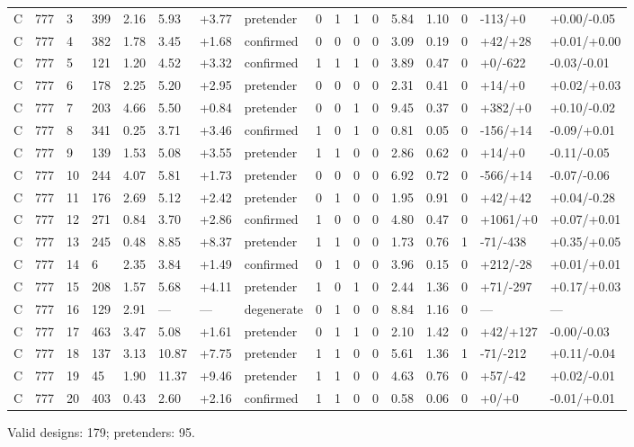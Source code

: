 \documentclass[11pt,a4paper]{article}
\begin{document}
{\begin{longtable}[]{@{}lllllllllllllllll@{}}
C & 777 & 3 & 399 & 2.16 & 5.93 & +3.77 & pretender & 0 & 1 & 1 & 0 & 5.84 & 1.10 & 0 & -113/+0 & +0.00/-0.05 \\
C & 777 & 4 & 382 & 1.78 & 3.45 & +1.68 & confirmed & 0 & 0 & 0 & 0 & 3.09 & 0.19 & 0 & +42/+28 & +0.01/+0.00 \\
C & 777 & 5 & 121 & 1.20 & 4.52 & +3.32 & confirmed & 1 & 1 & 1 & 0 & 3.89 & 0.47 & 0 & +0/-622 & -0.03/-0.01 \\
C & 777 & 6 & 178 & 2.25 & 5.20 & +2.95 & pretender & 0 & 0 & 0 & 0 & 2.31 & 0.41 & 0 & +14/+0 & +0.02/+0.03 \\
C & 777 & 7 & 203 & 4.66 & 5.50 & +0.84 & pretender & 0 & 0 & 1 & 0 & 9.45 & 0.37 & 0 & +382/+0 & +0.10/-0.02 \\
C & 777 & 8 & 341 & 0.25 & 3.71 & +3.46 & confirmed & 1 & 0 & 1 & 0 & 0.81 & 0.05 & 0 & -156/+14 & -0.09/+0.01 \\
C & 777 & 9 & 139 & 1.53 & 5.08 & +3.55 & pretender & 1 & 1 & 0 & 0 & 2.86 & 0.62 & 0 & +14/+0 & -0.11/-0.05 \\
C & 777 & 10 & 244 & 4.07 & 5.81 & +1.73 & pretender & 0 & 0 & 0 & 0 & 6.92 & 0.72 & 0 & -566/+14 & -0.07/-0.06 \\
C & 777 & 11 & 176 & 2.69 & 5.12 & +2.42 & pretender & 0 & 1 & 0 & 0 & 1.95 & 0.91 & 0 & +42/+42 & +0.04/-0.28 \\
C & 777 & 12 & 271 & 0.84 & 3.70 & +2.86 & confirmed & 1 & 0 & 0 & 0 & 4.80 & 0.47 & 0 & +1061/+0 & +0.07/+0.01 \\
C & 777 & 13 & 245 & 0.48 & 8.85 & +8.37 & pretender & 1 & 1 & 0 & 0 & 1.73 & 0.76 & 1 & -71/-438 & +0.35/+0.05 \\
C & 777 & 14 & 6 & 2.35 & 3.84 & +1.49 & confirmed & 0 & 1 & 0 & 0 & 3.96 & 0.15 & 0 & +212/-28 & +0.01/+0.01 \\
C & 777 & 15 & 208 & 1.57 & 5.68 & +4.11 & pretender & 1 & 0 & 1 & 0 & 2.44 & 1.36 & 0 & +71/-297 & +0.17/+0.03 \\
C & 777 & 16 & 129 & 2.91 & --- & --- & degenerate & 0 & 1 & 0 & 0 & 8.84 & 1.16 & 0 & --- & --- \\
C & 777 & 17 & 463 & 3.47 & 5.08 & +1.61 & pretender & 0 & 1 & 1 & 0 & 2.10 & 1.42 & 0 & +42/+127 & -0.00/-0.03 \\
C & 777 & 18 & 137 & 3.13 & 10.87 & +7.75 & pretender & 1 & 1 & 0 & 0 & 5.61 & 1.36 & 1 & -71/-212 & +0.11/-0.04 \\
C & 777 & 19 & 45 & 1.90 & 11.37 & +9.46 & pretender & 1 & 1 & 0 & 0 & 4.63 & 0.76 & 0 & +57/-42 & +0.02/-0.01 \\
C & 777 & 20 & 403 & 0.43 & 2.60 & +2.16 & confirmed & 1 & 1 & 0 & 0 & 0.58 & 0.06 & 0 & +0/+0 & -0.01/+0.01 \\
\end{longtable}
}
\endgroup

Valid designs: 179; pretenders: 95.
\end{document}
